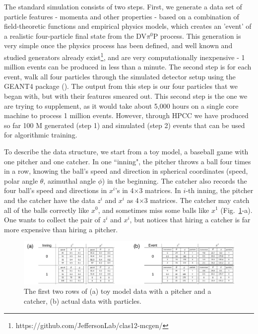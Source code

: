 The standard simulation consists of two steps. First, we generate a data set of particle features - momenta and other properties - based on a combination of field-theoretic functions and empirical physics models, which creates an 'event' of a realistic four-particle final state from the DV$\pi^0$P process. This generation is very simple once the physics process has been defined, and well known and studied generators already exist\footnote{https://github.com/JeffersonLab/clas12-mcgen/}, and are very computationally inexpensive - 1 million events can be produced in less than a minute. The second step is for each event, walk all four particles through the simulated detector setup using the GEANT4 package (\citet{AGOSTINELLI2003250}). The output from this step is our four particles that we began with, but with their features smeared out. This second step is the one we are trying to supplement, as it would take about 5,000 hours on a single core machine to process 1 million events. However, through HPCC we have produced so far 100 M generated (step 1) and simulated (step 2) events that can be used for algorithmic training. 


To describe the data structure, we start from a toy model, a baseball game with one pitcher and one catcher. In one ``inning", the pitcher throws a ball four times in a row, knowing the ball's speed and direction in spherical coordinates (speed, polar angle $\theta$, azimuthal angle $\phi$) in the beginning. The catcher also records the four ball's speed and directions in $x^{i}$'s in 4$\times$3 matrices. In $i$-th inning, the pitcher and the catcher have the data $z^{i}$ and $x^i$ as 4$\times$3 matrices. The catcher may catch all of the balls correctly like $x^0$, and sometimes miss some balls like $x^1$ (Fig.~\ref{data}-a). One wants to collect the pair of $z^i$ and $x^i$, but notices that hiring a catcher is far more expensive than hiring a pitcher.

\begin{figure}[!ht]
 \centering
   \includegraphics[width=0.8\linewidth]{dataDescription.pdf}
  \caption{The first two rows of (a) toy model data with a pitcher and a catcher, (b) actual data with particles.}
  \label{data}
\end{figure}

